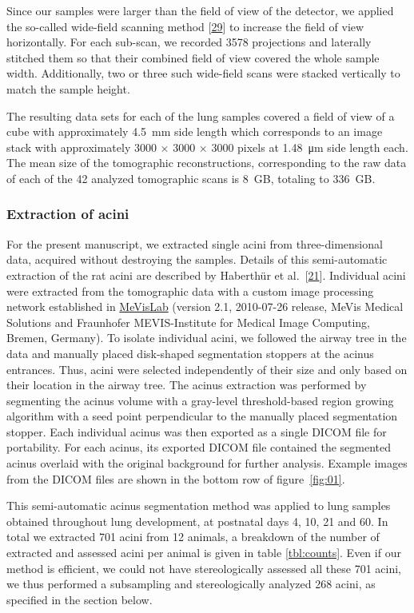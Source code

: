 \documentclass[
  american,
]{article}
\begin{document}
Since our samples were larger than the field of view of the detector, we applied the so-called wide-field scanning method {[}\protect\hyperlink{ref-VELl7OiR}{29}{]} to increase the field of view horizontally.
For each sub-scan, we recorded 3578 projections and laterally stitched them so that their combined field of view covered the whole sample width.
Additionally, two or three such wide-field scans were stacked vertically to match the sample height.

The resulting data sets for each of the lung samples covered a field of view of a cube with approximately 4.5~mm side length which corresponds to an image stack with approximately 3000 × 3000 × 3000 pixels at 1.48~μm side length each.
The mean size of the tomographic reconstructions, corresponding to the raw data of each of the 42 analyzed tomographic scans is 8~GB, totaling to 336~GB.

\hypertarget{extraction-of-acini}{%
\subsubsection{Extraction of acini}\label{extraction-of-acini}}

For the present manuscript, we extracted single acini from three-dimensional data, acquired without destroying the samples.
Details of this semi-automatic extraction of the rat acini are described by Haberthür et al.~{[}\protect\hyperlink{ref-7YLeeyu}{21}{]}.
Individual acini were extracted from the tomographic data with a custom image processing network established in \href{https://www.mevislab.de/}{MeVisLab} (version 2.1, 2010-07-26 release, MeVis Medical Solutions and Fraunhofer MEVIS-Institute for Medical Image Computing, Bremen, Germany).
To isolate individual acini, we followed the airway tree in the data and manually placed disk-shaped segmentation stoppers at the acinus entrances.
Thus, acini were selected independently of their size and only based on their location in the airway tree.
The acinus extraction was performed by segmenting the acinus volume with a gray-level threshold-based region growing algorithm with a seed point perpendicular to the manually placed segmentation stopper.
Each individual acinus was then exported as a single DICOM file for portability.
For each acinus, its exported DICOM file contained the segmented acinus overlaid with the original background for further analysis.
Example images from the DICOM files are shown in the bottom row of figure~\ref{fig:01}.

This semi-automatic acinus segmentation method was applied to lung samples obtained throughout lung development, at postnatal days 4, 10, 21 and 60.
In total we extracted 701 acini from 12 animals, a breakdown of the number of extracted and assessed acini per animal is given in table \ref{tbl:counts}.
Even if our method is efficient, we could not have stereologically assessed all these 701 acini, we thus performed a subsampling and stereologically analyzed 268 acini, as specified in the section below.
\end{document}
